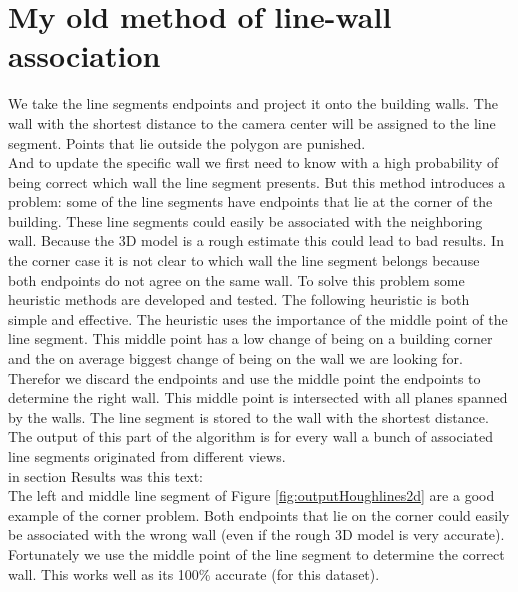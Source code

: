 \section{My old method of line-wall association}
\label{sec:oldmethodlwa}
We take the line segments endpoints and project it onto the building walls. The wall with the shortest
distance to the camera center will be assigned to the line segment. Points that
lie outside the polygon are punished.\\

And to update the specific wall we first need to know with a high probability of
being correct which wall the line segment presents.
But this method introduces a problem: some of the line segments have endpoints that lie at the corner of the building. These line segments could easily be associated with the neighboring wall. Because the 3D model is a rough estimate this could lead to bad results.
In the corner case it is not clear to which wall the line segment belongs because both endpoints do not agree on the same wall. To solve this problem some heuristic methods are developed and tested. The following heuristic is both simple and effective.
The heuristic uses the importance of the middle point of the line segment. This middle point has a low change of being on a building corner and the on average biggest change of being on the wall we are looking for.
Therefor we discard the endpoints and use the middle point the endpoints to determine the right wall.
This middle point is intersected with all planes spanned by the walls. The line segment is stored to the wall with the shortest distance.
The output of this part of the algorithm is for every wall a bunch of associated line segments originated from different views.\\

in section Results was this text:\\
The left and middle line segment of Figure \ref{fig:outputHoughlines2d} 
are
a good example of the corner problem. Both endpoints that lie on the corner could easily be associated
with the wrong wall (even if the rough 3D model is very accurate). Fortunately
we use the middle point of the line segment to determine the correct wall. This
works well as its 100\% accurate (for this dataset).

